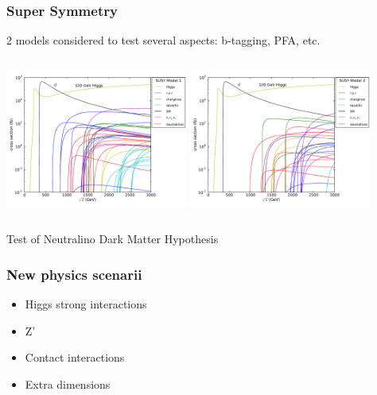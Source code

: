 \documentclass{beamer}
\begin{document}
\begin{frame}
\frametitle{Super Symmetry}
2 models considered to test several aspects: b-tagging, PFA, etc.
\begin{columns}[c]
\column{6cm}
\includegraphics[width=6cm]{susy_model1}
\column{6cm}
\includegraphics[width=6cm]{susy_model2}
\end{columns}
Test of Neutralino Dark Matter Hypothesis
\end{frame}

\begin{frame}
\frametitle{New physics scenarii}
\begin{itemize}
  \item Higgs strong interactions
  \item Z'
  \item Contact interactions
  \item Extra dimensions
\end{itemize}
\end{frame}
\end{document}
